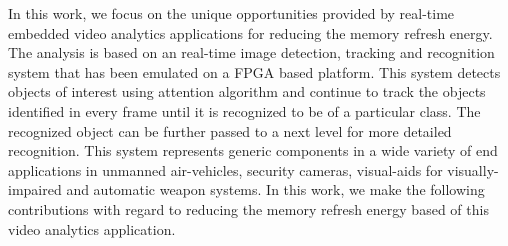 In this work, we focus on the unique opportunities provided by real-time embedded video analytics applications for reducing the memory refresh energy. The analysis is based on an real-time image detection, tracking and recognition system that has been emulated on a FPGA based platform. This system detects objects of interest using attention algorithm and continue to track the objects identified in every frame until it is recognized to be of a particular class. The recognized object can be further passed to a next level for more detailed recognition. This system represents generic components in a wide variety of end applications in unmanned air-vehicles, security cameras, visual-aids for visually-impaired and automatic weapon systems. In this work, we make the following contributions with regard to reducing the memory refresh energy based of this video analytics application.
